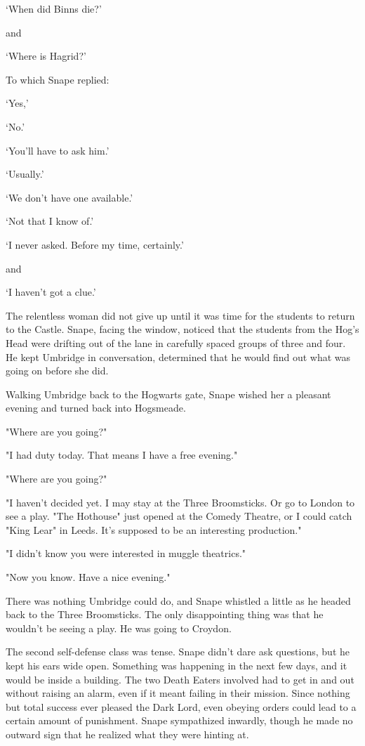 `When did Binns die?'

and

`Where is Hagrid?'

To which Snape replied:

`Yes,'

`No.'

`You'll have to ask him.'

`Usually.'

`We don't have one available.'

`Not that I know of.'

`I never asked. Before my time, certainly.'

and

`I haven't got a clue.'

The relentless woman did not give up until it was time for the students to return to the Castle. Snape, facing the window, noticed that the students from the Hog's Head were drifting out of the lane in carefully spaced groups of three and four. He kept Umbridge in conversation, determined that he would find out what was going on before she did.

Walking Umbridge back to the Hogwarts gate, Snape wished her a pleasant evening and turned back into Hogsmeade.

"Where are you going?"

"I had duty today. That means I have a free evening."

"Where are you going?"

"I haven't decided yet. I may stay at the Three Broomsticks. Or go to London to see a play. "The Hothouse" just opened at the Comedy Theatre, or I could catch "King Lear" in Leeds. It's supposed to be an interesting production."

"I didn't know you were interested in muggle theatrics."

"Now you know. Have a nice evening."

There was nothing Umbridge could do, and Snape whistled a little as he headed back to the Three Broomsticks. The only disappointing thing was that he wouldn't be seeing a play. He was going to Croydon.

The second self-defense class was tense. Snape didn't dare ask questions, but he kept his ears wide open. Something was happening in the next few days, and it would be inside a building. The two Death Eaters involved had to get in and out without raising an alarm, even if it meant failing in their mission. Since nothing but total success ever pleased the Dark Lord, even obeying orders could lead to a certain amount of punishment. Snape sympathized inwardly, though he made no outward sign that he realized what they were hinting at.

